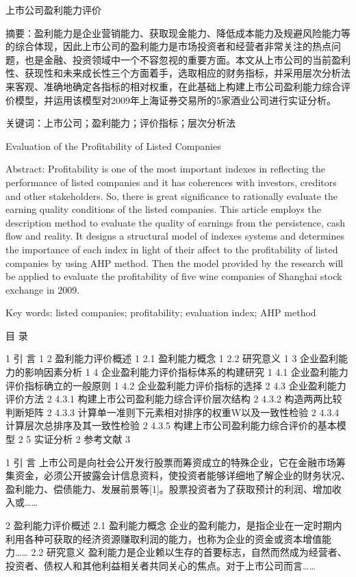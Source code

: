 \documentclass{ctexart}
\begin{document}
上市公司盈利能力评价

摘要：盈利能力是企业营销能力、获取现金能力、降低成本能力及规避风险能力等的综合体现，因此上市公司的盈利能力是市场投资者和经营者非常关注的热点问题，也是金融、投资领域中一个不容忽视的重要方面。本文从上市公司的当前盈利性、获现性和未来成长性三个方面着手，选取相应的财务指标，并采用层次分析法来客观、准确地确定各指标的相对权重，在此基础上构建上市公司盈利能力综合评价模型，并运用该模型对2009年上海证券交易所的5家酒业公司进行实证分析。

关键词：上市公司；盈利能力；评价指标；层次分析法


Evaluation of the Profitability of Listed Companies

Abstract: Profitability is one of the most important indexes in reflecting the performance of listed companies and it has coherences with investors, creditors and other stakeholders. So, there is great significance to rationally evaluate the earning quality conditions of the listed companies. This article employs the description method to evaluate the quality of earnings from the persistence, cash flow and reality. It designs a structural model of indexes systems and determines the importance of each index in light of their affect to the profitability of listed companies by using AHP method. Then the model provided by the research will be applied to evaluate the profitability of five wine companies of Shanghai stock exchange in 2009.

Key words: listed companies; profitability; evaluation index; AHP method

目  录

1  引  言	1
2  盈利能力评价概述	1
2.1  盈利能力概念	1
2.2  研究意义	1
3  企业盈利能力的影响因素分析	1
4  企业盈利能力评价指标体系的构建研究	1
4.1  企业盈利能力评价指标确立的一般原则	1
4.2  企业盈利能力评价指标的选择	2
4.3  企业盈利能力评价方法	2
4.3.1  构建上市公司盈利能力综合评价层次结构	2
4.3.2  构造两两比较判断矩阵	2
4.3.3  计算单一准则下元素相对排序的权重W以及一致性检验	2
4.3.4  计算层次总排序及其一致性检验	2
4.3.5  构建上市公司盈利能力综合评价的基本模型	2
5  实证分析	2
参考文献	3


1  引  言
上市公司是向社会公开发行股票而筹资成立的特殊企业，它在金融市场筹集资金，必须公开披露会计信息资料，使投资者能够详细地了解企业的财务状况、盈利能力、偿债能力、发展前景等[1]。股票投资者为了获取预计的利润、增加收入或……

2  盈利能力评价概述
2.1  盈利能力概念
企业的盈利能力，是指企业在一定时期内利用各种可获取的经济资源赚取利润的能力，也称为企业的资金或资本增值能力……
2.2  研究意义 
盈利能力是企业赖以生存的首要标志，自然而然成为经营者、投资者、债权人和其他利益相关者共同关心的焦点。对于上市公司而言……
\end{document}
